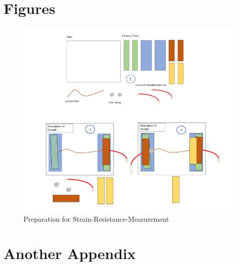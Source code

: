 \begin{appendices}[Appendix]

\label{sec:Appendix}

\section{Figures}
\label{appendix:fig}

\begin{figure}[hb!]
    \centering
    \includegraphics[width=.8\textwidth]{./pic/Meas_Prep_Together.PNG}
    \caption{Preparation for 
Strain-Resistance-Measurement}
    \label{fig:MeasPrep}
\end{figure}

\section{Another Appendix}


\end{appendices}
\clearpage
